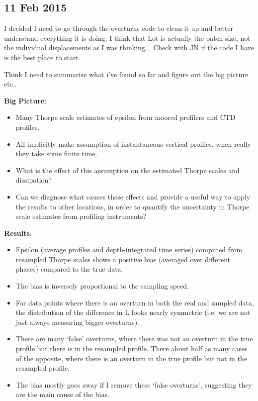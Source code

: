 \documentclass[11pt]{article}
\begin{document}
\clearpage
\newpage
\subsection{11 Feb 2015}

I decided I need to go through the overturns code to clean it up and better understand everything it is doing. I think that Lot is actually the patch size, not the individual displacements as I was thinking... Check with JN if the code I have is the best place to start.

\vspace{1cm}

Think I need to summarize what i've found so far and figure out the big picture etc.. 

\vspace{1cm}

\textbf{Big Picture}:

\begin{itemize}
\item Many Thorpe scale estimates of epsilon from moored profilers and CTD profiles.
\item All implicitly make assumption of instantaneous vertical profiles, when really they take some finite time.
\item What is the effect of this assumption on the estimated Thorpe scales and dissipation?
\item Can we diagnose what causes these effects and provide a useful way to apply the results to other locations, in order to quantify the uncertainty in Thorpe scale estimates from profiling instruments?
\end{itemize}


\textbf{Results}:
\begin{itemize}
\item Epsilon (average profiles and depth-integrated time series) computed from resampled Thorpe scales shows a positive bias (averaged over different phases) compared to the true data.
\item The bias is inversely proportional to the sampling speed.
\item For data points where there is an overturn in both the real and sampled data, the distribution of the difference in L looks nearly symmetric (i.e. we are not just always measuring bigger overturns). 
\item There are many `false' overturns, where there was not an overturn in the true profile but there is in the resampled profile. There about half as many cases of the opposite, where there is an overturn in the true profile but not in the resampled profile. 
\item The bias mostly goes away if I remove these `false overturns', suggesting they are the main cause of the bias.
\end{itemize}
\end{document}
